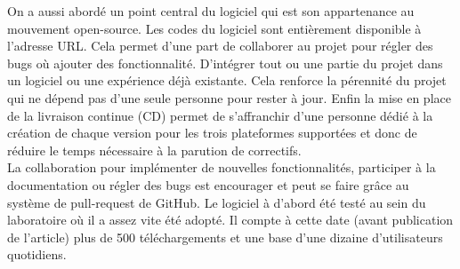 	On a aussi abordé un point central du logiciel qui est son appartenance au mouvement open-source. Les codes du logiciel sont entièrement disponible à l'adresse URL. Cela permet d'une part de collaborer au projet pour régler des bugs où ajouter des fonctionnalité. D'intégrer tout ou une partie du projet dans un logiciel ou une expérience déjà existante. Cela renforce la pérennité du projet qui ne dépend pas d'une seule personne pour rester à jour. Enfin la mise en place de la livraison continue (CD) permet de s'affranchir d'une personne dédié à la création de chaque version pour les trois plateformes supportées et donc de réduire le temps nécessaire à la parution de correctifs.\\
	
	La collaboration pour implémenter de nouvelles fonctionnalités, participer à la documentation ou régler des bugs est encourager et peut se faire grâce au système de pull-request de GitHub. Le logiciel à d'abord été testé au sein du laboratoire où il a assez vite été adopté. Il compte à cette date (avant publication de l'article) plus de 500 téléchargements et une base d'une dizaine d'utilisateurs quotidiens.
	
	

